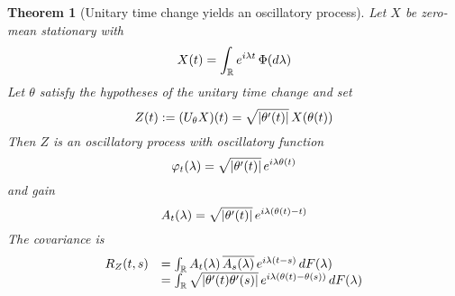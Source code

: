 \documentclass{article}
\newcommand{\assign}{:=}
\newtheorem{theorem}{Theorem}
\begin{document}
\begin{theorem}
  [Unitary time change yields an oscillatory process] Let $X$ be zero-mean
  stationary with
  \begin{equation}
    X (t) = \int_{\mathbb{R}} e^{i \lambda t}  \hspace{0.17em} \Phi (d
    \lambda)
  \end{equation}
  Let $\theta$ satisfy the hypotheses of the unitary time change and set
  \begin{equation}
    Z (t) \assign (U_{\theta} X) (t) = \sqrt{| \theta' (t) |}  \hspace{0.17em}
    X (\theta (t))
  \end{equation}
  Then $Z$ is an oscillatory process with oscillatory function
  \begin{equation}
    \varphi_t (\lambda) = \sqrt{| \theta' (t) |}  \hspace{0.17em} e^{i \lambda
    \theta (t)}
  \end{equation}
  and gain
  \begin{equation}
    A_t (\lambda) = \sqrt{| \theta' (t) |}  \hspace{0.17em} e^{i \lambda
    (\theta (t) - t)}
  \end{equation}
  The covariance is
  \begin{equation}
    \begin{array}{ll}
      R_Z (t, s) & = \int_{\mathbb{R}} A_t (\lambda) \hspace{0.17em}
      \overline{A_s (\lambda)} \hspace{0.17em} e^{i \lambda (t - s)} 
      \hspace{0.17em} dF (\lambda)\\
      & = \int_{\mathbb{R}} \sqrt{| \theta' (t) \theta' (s) |} 
      \hspace{0.17em} e^{i \lambda (\theta (t) - \theta (s))}  \hspace{0.17em}
      dF (\lambda)
    \end{array}
  \end{equation}
\end{theorem}
\end{document}
